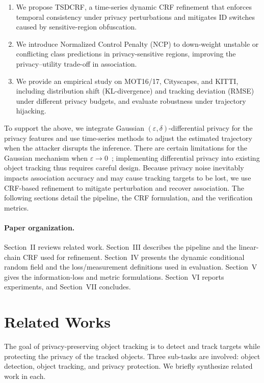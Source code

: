 \documentclass[trans]{IEEEtran}
\begin{document}
\begin{enumerate}
    \item We propose TSDCRF, a time-series dynamic CRF refinement that enforces temporal consistency under privacy perturbations and mitigates ID switches caused by sensitive-region obfuscation.
    \item We introduce Normalized Control Penalty (NCP) to down-weight unstable or conflicting class predictions in privacy-sensitive regions, improving the privacy--utility trade-off in association.
    \item We provide an empirical study on MOT16/17, Cityscapes, and KITTI, including distribution shift (KL-divergence) and tracking deviation (RMSE) under different privacy budgets, and evaluate robustness under trajectory hijacking.
\end{enumerate}

To support the above, we integrate Gaussian $(\varepsilon,\delta)$-differential privacy for the privacy features and use time-series methods to adjust the estimated trajectory when the attacker disrupts the inference. There are certain limitations for the Gaussian mechanism when $\varepsilon \rightarrow 0$~\cite{balle2018improving}; implementing differential privacy into existing object tracking thus requires careful design. Because privacy noise inevitably impacts association accuracy and may cause tracking targets to be lost, we use CRF-based refinement to mitigate perturbation and recover association. The following sections detail the pipeline, the CRF formulation, and the verification metrics.

\paragraph{Paper organization.} Section~II reviews related work. Section~III describes the pipeline and the linear-chain CRF used for refinement. Section~IV presents the dynamic conditional random field and the loss/measurement definitions used in evaluation. Section~V gives the information-loss and metric formulations. Section~VI reports experiments, and Section~VII concludes.

\section{Related Works}
The goal of privacy-preserving object tracking is to detect and track targets while protecting the privacy of the tracked objects. Three sub-tasks are involved: object detection, object tracking, and privacy protection. We briefly synthesize related work in each.
\end{document}
